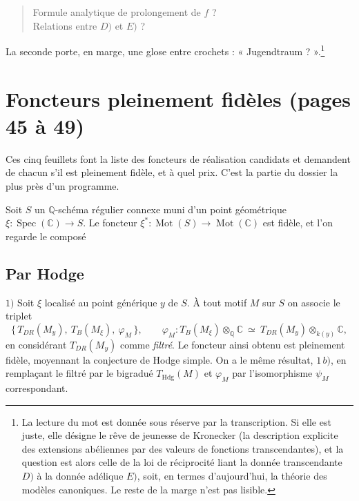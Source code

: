\documentclass[11pt,a4paper]{article}
\begin{document}
\begin{quote}
Formule analytique de prolongement de $f$ ? \\
Relations entre $D)$ et $E)$ ?
\end{quote}

La seconde porte, en marge, une glose entre crochets : « Jugendtraum
? ».\footnote{La lecture du mot est donnée sous réserve par la transcription. Si
elle est juste, elle désigne le rêve de jeunesse de Kronecker (la description
explicite des extensions abéliennes par des valeurs de fonctions transcendantes),
et la question est alors celle de la loi de réciprocité liant la donnée
transcendante $D)$ à la donnée adélique $E)$, soit, en termes
d'aujourd'hui, la théorie des modèles canoniques. Le reste de la marge n'est pas
lisible.}

\section*{Foncteurs pleinement fidèles (pages 45 à 49)}

Ces cinq feuillets font la liste des foncteurs de réalisation candidats et
demandent de chacun s'il est pleinement fidèle, et à quel prix. C'est la partie
du dossier la plus près d'un programme.

Soit $S$ un $\mathbb{Q}$-schéma régulier connexe muni d'un point géométrique
$\xi : \operatorname{Spec}(\mathbb{C}) \to S$. Le foncteur
$\xi^{*} : \operatorname{Mot}(S) \to \operatorname{Mot}(\mathbb{C})$ est fidèle,
et l'on regarde le composé


\subsection*{Par Hodge}

$1)$ Soit $\xi$ localisé au point générique $y$ de $S$. À tout motif $M$ sur $S$
on associe le triplet
\[
\{\, T_{DR}(M_{y}),\ T_{B}(M_{\xi}),\ \varphi_{M} \,\} ,
\qquad
\varphi_{M} : T_{B}(M_{\xi}) \otimes_{\mathbb{Q}} \mathbb{C} \ \simeq \ T_{DR}(M_{y}) \otimes_{k(y)} \mathbb{C} ,
\]
en considérant $T_{DR}(M_{y})$ comme \emph{filtré}. Le foncteur ainsi obtenu est
pleinement fidèle, moyennant la conjecture de Hodge simple. On a le même
résultat, $1\,b)$, en remplaçant le filtré par le bigradué
$T_{\mathrm{Hdg}}(M)$ et $\varphi_{M}$ par l'isomorphisme $\psi_{M}$
correspondant.
\end{document}
